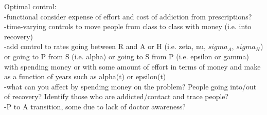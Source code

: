 \documentclass[12pt]{article}
\begin{document}
Optimal control: \\
-functional consider expense of effort and cost of addiction from prescriptions? \\
-time-varying controls to move people from class to class with money (i.e. into recovery) \\
-add control to rates going between R and A or H (i.e. zeta, nu, $sigma_A$, $sigma_H$) or going to P from S (i.e. alpha) or going to S from P (i.e. epsilon or gamma) with spending money or with some amount of effort in terms of money and make as a function of years such as alpha(t) or epsilon(t) \\
-what can you affect by spending money on the problem? People going into/out of recovery? Identify those who are addicted/contact and trace people? \\
-P to A transition, some due to lack of doctor awareness? \\


 



 




\pagebreak



 
\end{document}
